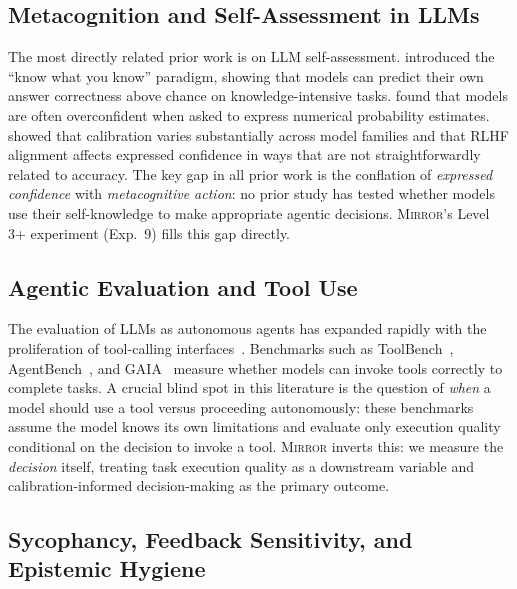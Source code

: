 \documentclass[10pt]{article}
\newcommand{\mirror}{\textsc{Mirror}}
\begin{document}
\subsection{Metacognition and Self-Assessment in LLMs}

The most directly related prior work is on LLM self-assessment. \citet{kadavath2022language}
introduced the ``know what you know'' paradigm, showing that models can predict their own
answer correctness above chance on knowledge-intensive tasks. \citet{xiong2023can} found
that models are often overconfident when asked to express numerical probability estimates.
\citet{stengel2023calibrated} showed that calibration varies substantially across model
families and that RLHF alignment affects expressed confidence in ways that are not
straightforwardly related to accuracy. The key gap in all prior work is the conflation
of \textit{expressed confidence} with \textit{metacognitive action}: no prior study
has tested whether models use their self-knowledge to make appropriate agentic
decisions. \mirror{}'s Level 3+ experiment (Exp.~9) fills this gap directly.

\subsection{Agentic Evaluation and Tool Use}

The evaluation of LLMs as autonomous agents has expanded rapidly with the proliferation
of tool-calling interfaces~\citep{mialon2023augmented, patil2023gorilla}. Benchmarks
such as ToolBench~\citep{qin2023toolbench}, AgentBench~\citep{liu2023agentbench}, and
GAIA~\citep{mialon2023gaia} measure whether models can invoke tools correctly to complete
tasks. A crucial blind spot in this literature is the question of \textit{when} a model
should use a tool versus proceeding autonomously: these benchmarks assume the model knows
its own limitations and evaluate only execution quality conditional on the decision to
invoke a tool. \mirror{} inverts this: we measure the \textit{decision} itself, treating
task execution quality as a downstream variable and calibration-informed decision-making
as the primary outcome.

\subsection{Sycophancy, Feedback Sensitivity, and Epistemic Hygiene}
\end{document}
